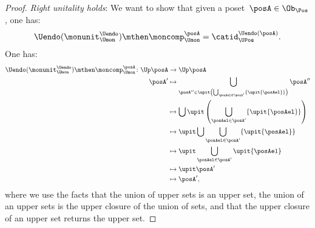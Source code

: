 \begin{proof}
    \emph{Right unitality holds}: We want to show that given a poset~$\posA\in \Ob_\Pos$, one has:
    \begin{equation}
        \Uendo(\monunit_{\Umon}^{\Uendo})\mthen \moncomp_{\Umon}^{\posA}=\catid_{\UPos}^{\Uendo(\posA)}.
    \end{equation}
    One has:
    \begin{equation*}
        \begin{aligned}
            \Uendo(\monunit_{\Umon}^{\Uendo})\mthen \moncomp_{\Umon}^{\posA}\colon \Up \posA & \to \Up \posA                                                                                              \\
            \posA'                                                                           & \mapsto \bigcup_{\posA''\in \upit \left( \bigcup_{\posAel \in \posA'}\{ \upit \{\posAel\}\}\right)}\posA'' \\
                                                                                             & \mapsto \bigcup \upit \left( \bigcup_{\posAel \in \posA'}\{\upit \{ \posAel\} \}\right)                    \\
                                                                                             & \mapsto \upit \bigcup   \bigcup_{\posAel \in \posA'}\{\upit \{ \posAel\} \}                                \\
                                                                                             & \mapsto \upit \bigcup_{\posAel \in \posA'}\upit \{ \posAel\}                                               \\
                                                                                             & \mapsto \upit \posA'                                                                                       \\
                                                                                             & \mapsto \posA',
        \end{aligned}
    \end{equation*}
    where we use the facts that the union of upper sets is an upper set, the union of an upper sets is the upper closure of the union of sets, and that the upper closure of an upper set returns the upper set.


\end{proof}

